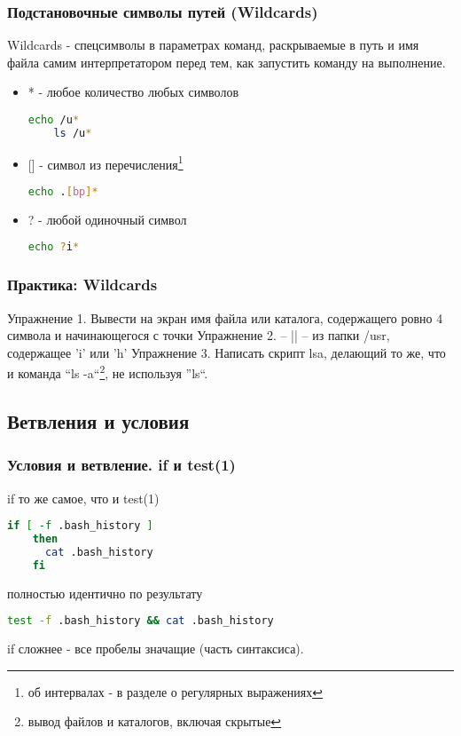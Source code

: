 \begin{frame}[fragile]
  \frametitle{Подстановочные символы путей (Wildcards)}

  \alert{Wildcards} - спецсимволы в параметрах команд, раскрываемые в путь и имя файла самим интерпретатором перед тем, как запустить команду на выполнение. \pause


  \begin{itemize}
    \item \alert{*} - любое количество любых символов
\begin{lstlisting}[language=sh,frame=single,basicstyle=\normalsize,breaklines=true]
	echo /u*
	ls /u*
\end{lstlisting} \pause
    \item \alert{[]} - символ из перечисления\footnote{об интервалах - в разделе о регулярных выражениях}
\begin{lstlisting}[language=sh,frame=single,basicstyle=\normalsize,breaklines=true]
	echo .[bp]*
\end{lstlisting} \pause
    \item \alert{?} - любой одиночный символ
\begin{lstlisting}[language=sh,frame=single,basicstyle=\normalsize,breaklines=true]
	echo ?i*
\end{lstlisting} 
  \end{itemize}

\end{frame}

\begin{frame}
  \frametitle{Практика: Wildcards}

  \alert{Упражнение 1.} Вывести на экран имя файла или каталога, содержащего ровно 4 символа и начинающегося с точки
  \pause
  \alert{Упражнение 2.} -- || --  из папки /usr, содержащее 'i' или 'h'
  \pause
  \alert{Упражнение 3.} Написать скрипт lsa, делающий то же, что и команда ``ls -a``\footnote{вывод файлов и каталогов, включая скрытые}, не используя ''ls``.
\end{frame}

\subsection{Ветвления и условия}

\begin{frame}[fragile]
  \frametitle{Условия и ветвление. if и test(1)}

  \alert{if то же самое, что и test(1)} \pause

\begin{lstlisting}[language=sh,frame=single,basicstyle=\normalsize,breaklines=true]
	if [ -f .bash_history ]
	then
	  cat .bash_history
	fi
\end{lstlisting} 
      полностью идентично по результату
\begin{lstlisting}[language=sh,frame=single,basicstyle=\normalsize,breaklines=true]
	test -f .bash_history && cat .bash_history
\end{lstlisting}
      if сложнее - все пробелы значащие (часть синтаксиса).
\end{frame}

